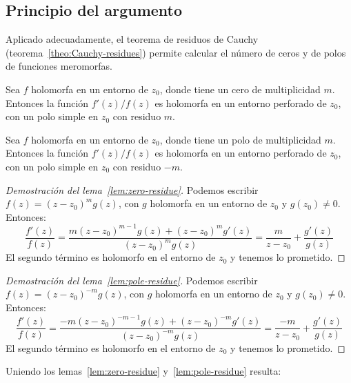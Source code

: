 \subsection{Principio del argumento}
\label{sec:argument-principle}

  Aplicado adecuadamente,
  el teorema de residuos de Cauchy
  (teorema~\ref{theo:Cauchy-residues})
  permite calcular el número de ceros y de polos
  de funciones meromorfas.
  \begin{lemma}
    \label{lem:zero-residue}
    Sea \(f\) holomorfa en un entorno de \(z_0\),
    donde tiene un cero de multiplicidad \(m\).
    Entonces la función \(f'(z) / f(z)\)
    es holomorfa en un entorno perforado de \(z_0\),
    con un polo simple en \(z_0\) con residuo \(m\).
  \end{lemma}
  \begin{lemma}
    \label{lem:pole-residue}
    Sea \(f\) holomorfa en un entorno de \(z_0\),
    donde tiene un polo de multiplicidad \(m\).
    Entonces la función \(f'(z) / f(z)\)
    es holomorfa en un entorno perforado de \(z_0\),
    con un polo simple en \(z_0\) con residuo \(-m\).
  \end{lemma}
  \begin{proof}[Demostración del lema~\ref{lem:zero-residue}]
    Podemos escribir \(f(z) = (z - z_0)^m g(z)\),
    con \(g\) holomorfa en un entorno de \(z_0\) y \(g(z_0) \ne 0\).
    Entonces:
    \begin{equation*}
      \frac{f'(z)}{f(z)}
	= \frac{m (z - z_0)^{m - 1} g(z) + (z - z_0)^m g'(z)}
	       {(z - z_0)^m g(z)}
	= \frac{m}{z - z_0} + \frac{g'(z)}{g(z)}
    \end{equation*}
    El segundo término es holomorfo en el entorno de \(z_0\)
    y tenemos lo prometido.
  \end{proof}
  \begin{proof}[Demostración del lema~\ref{lem:pole-residue}]
    Podemos escribir \(f(z) = (z - z_0)^{-m} g(z)\),
    con \(g\) holomorfa en un entorno de \(z_0\) y \(g(z_0) \ne 0\).
    Entonces:
    \begin{equation*}
      \frac{f'(z)}{f(z)}
	= \frac{-m (z - z_0)^{-m - 1} g(z) + (z - z_0)^{-m} g'(z)}
	       {(z - z_0)^{-m} g(z)}
	= \frac{-m}{z - z_0} + \frac{g'(z)}{g(z)}
    \end{equation*}
    El segundo término es holomorfo en el entorno de \(z_0\)
    y tenemos lo prometido.
  \end{proof}
  Uniendo los lemas~\ref{lem:zero-residue} y~\ref{lem:pole-residue}
  resulta:
